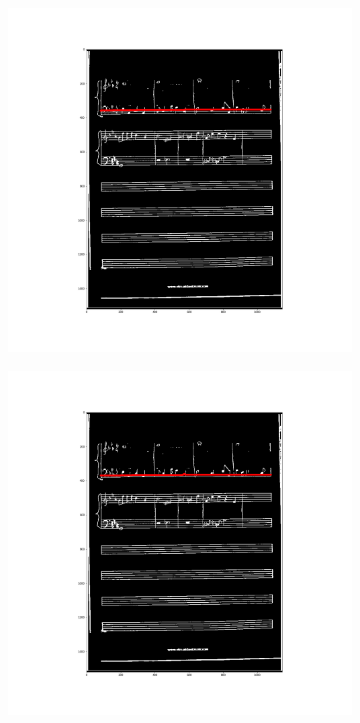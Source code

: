 \documentclass[12pt]{article}
\begin{document}
\begin{figure}[h!]
\begin{subfigure}[b]{0.32\linewidth}
		\end{subfigure}
		\begin{subfigure}[b]{0.32\linewidth}
			\includegraphics[width=\linewidth]{zdj/BFS8.png}
		\end{subfigure}
		\begin{subfigure}[b]{0.32\linewidth}
			\includegraphics[width=\linewidth]{zdj/BFS9.png}

\end{subfigure}
\end{figure}
\end{document}

